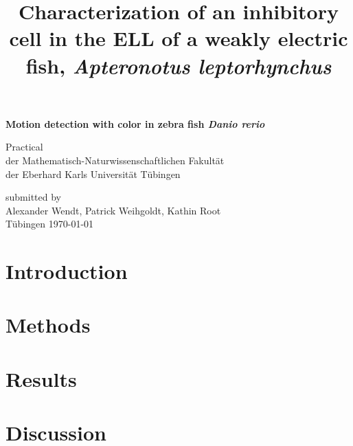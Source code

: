 \documentclass[a4paper] {scrartcl}
\title{Characterization of an inhibitory cell in the ELL of a weakly electric fish, \textit{Apteronotus leptorhynchus}}
\begin{document}
\setlength{\parindent}{0em}
\begin{titlepage}
\begin{center}
\LARGE\textbf{Motion detection with color in zebra fish \textit{Danio rerio}}
\end{center}
\vspace{4cm}
\begin{center}
\Large {Practical \\
der Mathematisch-Naturwissenschaftlichen Fakultät\\
der Eberhard Karls Universität Tübingen\\}
\end{center}
\vspace*{7cm}
\begin{center}
\Large {submitted by \\
Alexander Wendt, Patrick Weihgoldt, Kathin Root\\
Tübingen \today}
\end{center}
\end{titlepage}
\newpage
\newpage
\tableofcontents 
\newpage

\section{Introduction}

\section{Methods}


\section{Results}

\section{Discussion}
\end{document}
